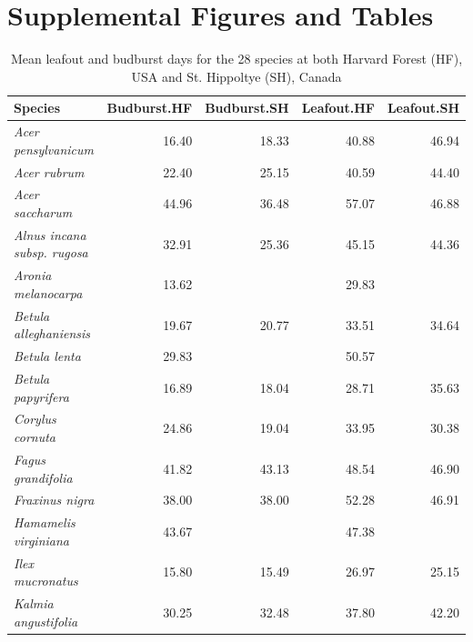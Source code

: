 \documentclass{article}
\begin{document}




\section*{Supplemental Figures and Tables}

\begin{table}[ht]
\centering
\caption{Mean leafout and budburst days for the 28 species at both Harvard Forest (HF), USA and St. Hippoltye (SH), Canada} 
\begin{tabular}{lrrrr}
  \hline
Species & Budburst.HF & Budburst.SH & Leafout.HF & Leafout.SH \\ 
  \hline
\textit{Acer pensylvanicum} & 16.40 & 18.33 & 40.88 & 46.94 \\ 
  \textit{Acer rubrum} & 22.40 & 25.15 & 40.59 & 44.40 \\ 
  \textit{Acer saccharum} & 44.96 & 36.48 & 57.07 & 46.88 \\ 
  \textit{Alnus incana subsp. rugosa} & 32.91 & 25.36 & 45.15 & 44.36 \\ 
  \textit{Aronia melanocarpa} & 13.62 &  & 29.83 &  \\ 
  \textit{Betula alleghaniensis} & 19.67 & 20.77 & 33.51 & 34.64 \\ 
  \textit{Betula lenta} & 29.83 &  & 50.57 &  \\ 
  \textit{Betula papyrifera} & 16.89 & 18.04 & 28.71 & 35.63 \\ 
  \textit{Corylus cornuta} & 24.86 & 19.04 & 33.95 & 30.38 \\ 
  \textit{Fagus grandifolia} & 41.82 & 43.13 & 48.54 & 46.90 \\ 
  \textit{Fraxinus nigra} & 38.00 & 38.00 & 52.28 & 46.91 \\ 
  \textit{Hamamelis virginiana} & 43.67 &  & 47.38 &  \\ 
  \textit{Ilex mucronatus} & 15.80 & 15.49 & 26.97 & 25.15 \\ 
  \textit{Kalmia angustifolia} & 30.25 & 32.48 & 37.80 & 42.20 \\ 

\end{tabular}
\end{table}
\end{document}
